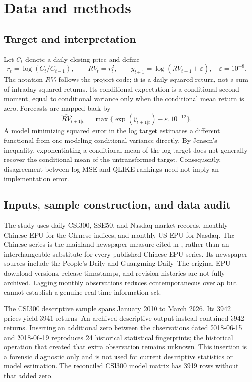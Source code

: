 \section{Data and methods}
\label{sec:methods}
\subsection{Target and interpretation}
Let $C_t$ denote a daily closing price and define
\begin{equation}
r_t=\log(C_t/C_{t-1}),\qquad RV_t=r_t^2,\qquad
 y_{t+1}=\log(RV_{t+1}+\varepsilon),\quad\varepsilon=10^{-8}.
\end{equation}
The notation $RV_t$ follows the project code; it is a daily squared return, not a sum of intraday squared returns. Its conditional expectation is a conditional second moment, equal to conditional variance only when the conditional mean return is zero. Forecasts are mapped back by
\begin{equation}
\widehat{RV}_{t+1|t}=\max\{\exp(\widehat y_{t+1|t})-\varepsilon,10^{-12}\}.
\end{equation}
A model minimizing squared error in the log target estimates a different functional from one modeling conditional variance directly. By Jensen's inequality, exponentiating a conditional mean of the log target does not generally recover the conditional mean of the untransformed target. Consequently, disagreement between log-MSE and QLIKE rankings need not imply an implementation error.

\subsection{Inputs, sample construction, and data audit}
The study uses daily CSI300, SSE50, and Nasdaq market records, monthly Chinese EPU for the Chinese indices, and monthly US EPU for Nasdaq. The Chinese series is the mainland-newspaper measure cited in \citet{DavisLiuSheng2019}, rather than an interchangeable substitute for every published Chinese EPU series. Its newspaper sources include the People's Daily and Guangming Daily. The original EPU download versions, release timestamps, and revision histories are not fully archived. Lagging monthly observations reduces contemporaneous overlap but cannot establish a genuine real-time information set.

The CSI300 descriptive sample spans January 2010 to March 2026. Its 3942 prices yield 3941 returns. An archived descriptive output instead contained 3942 returns. Inserting an additional zero between the observations dated 2018-06-15 and 2018-06-19 reproduces 24 historical statistical fingerprints; the historical operation that created that extra observation remains unknown. This insertion is a forensic diagnostic only and is not used for current descriptive statistics or model estimation. The reconciled CSI300 model matrix has 3919 rows without that added zero.

